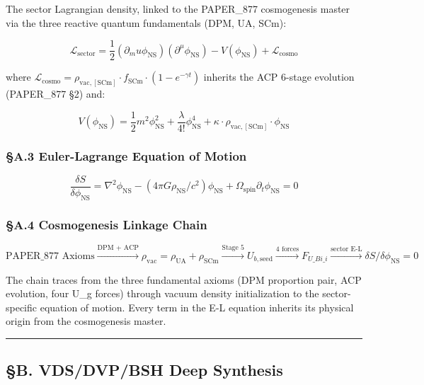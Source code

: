 The sector Lagrangian density, linked to the PAPER\_877 cosmogenesis
master via the three reactive quantum fundamentals (DPM, UA, SCm):

\[\mathcal{L}_{\mathrm{sector}} = \frac{1}{2}(\partial_mu \phi_{\mathrm{NS}})(\partial^\mu \phi_{\mathrm{NS}}) - V(\phi_{\mathrm{NS}}) + \mathcal{L}_{\mathrm{cosmo}}\]

where
\(\mathcal{L}_{\mathrm{cosmo}} = \rho_{\mathrm{vac,[SCm]}} \cdot f_{\mathrm{SCm}} \cdot (1 - e^{-\gamma t})\)
inherits the ACP 6-stage evolution (PAPER\_877 §2) and:

\[V(\phi_{\mathrm{NS}}) = \frac{1}{2} m^2 \phi_{\mathrm{NS}}^2 + \frac{\lambda}{4!} \phi_{\mathrm{NS}}^4 + \kappa \cdot \rho_{\mathrm{vac,[SCm]}} \cdot \phi_{\mathrm{NS}}\]

\subsubsection{§A.3 Euler-Lagrange Equation of
Motion}\label{a.3-euler-lagrange-equation-of-motion}

\[\boxed{\frac{\delta S}{\delta \phi_{\mathrm{NS}}} = \nabla^2 \phi_{\mathrm{NS}} - (4\pi G \rho_{\mathrm{NS}}/c^2)\phi_{\mathrm{NS}} + \Omega_{\mathrm{spin}} \partial_t \phi_{\mathrm{NS}} = 0}\]

\subsubsection{§A.4 Cosmogenesis Linkage
Chain}\label{a.4-cosmogenesis-linkage-chain}

\[\text{PAPER\_877 Axioms} \xrightarrow{\text{DPM + ACP}} \rho_{\mathrm{vac}} = \rho_{\mathrm{UA}} + \rho_{\mathrm{SCm}} \xrightarrow{\text{Stage 5}} U_{b,\mathrm{seed}} \xrightarrow{\text{4 forces}} F_{U\_Bi\_i} \xrightarrow{\text{sector E-L}} \delta S/\delta \phi_{\mathrm{NS}} = 0\]

The chain traces from the three fundamental axioms (DPM proportion pair,
ACP evolution, four U\_g forces) through vacuum density initialization
to the sector-specific equation of motion. Every term in the E-L
equation inherits its physical origin from the cosmogenesis master.

\begin{center}\rule{0.5\linewidth}{0.5pt}\end{center}

\subsection{§B. VDS/DVP/BSH Deep
Synthesis}\label{b.-vdsdvpbsh-deep-synthesis}

